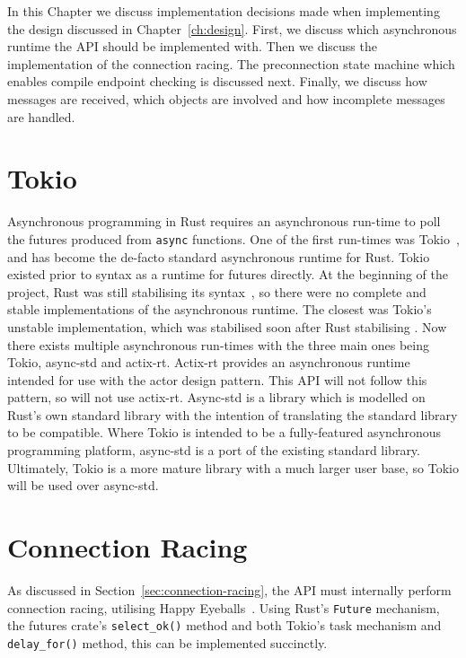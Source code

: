 In this Chapter we discuss implementation decisions made when implementing the design discussed in
Chapter~\ref{ch:design}.
First, we discuss which asynchronous runtime the API should be implemented with.
Then we discuss the implementation of the connection racing.
The preconnection state machine which enables compile endpoint checking is discussed next.
Finally, we discuss how messages are received, which objects are involved and how incomplete messages are handled.

\section{Tokio}\label{sec:tokio}
Asynchronous programming in Rust requires an asynchronous run-time to poll the futures produced from \texttt{async}
functions.
One of the first run-times was Tokio~\citep{tokiocommunity_tokioasynchronousruntime_}, and has become the de-facto standard
asynchronous runtime for Rust.
Tokio existed prior to \asyncawait{} syntax as a runtime for futures directly.
At the beginning of the project, Rust was still stabilising its \asyncawait{} syntax~\citep{withoutboats_asyncawaitnotation_},
so there were no complete and stable implementations of the asynchronous runtime.
The closest was Tokio's unstable implementation, which was stabilised soon after Rust stabilising
\asyncawait{}.
Now there exists multiple asynchronous run-times with the three main ones being Tokio, async-std and actix-rt.
Actix-rt provides an asynchronous runtime intended for use with the actor design pattern.
This API will not follow this pattern, so will not use actix-rt.
Async-std is a library which is modelled on Rust's own standard library with the intention of translating the standard
library to be \asyncawait{} compatible.
Where Tokio is intended to be a fully-featured asynchronous programming platform, async-std is a port of the existing
standard library.
Ultimately, Tokio is a more mature library with a much larger user base, so Tokio will be used over async-std.

\section{Connection Racing}\label{sec:connection-racing-impl}
As discussed in Section~\ref{sec:connection-racing}, the API must internally perform connection racing, utilising
Happy Eyeballs~\citep{pauly_happyeyeballsversion_}.
Using Rust's \texttt{Future} mechanism, the futures crate's \texttt{select\_ok()} method and both Tokio's task mechanism
and \texttt{delay\_for()} method, this can be implemented succinctly.

